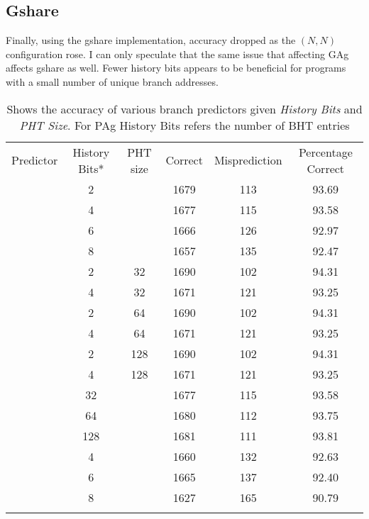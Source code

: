 \documentclass[letterpaper,11pt]{article}
\begin{document}
\subsection{Gshare}
Finally, using the gshare implementation, accuracy dropped as the $(N,N)$ configuration rose. I can only speculate that the same issue that affecting GAg affects gshare as well. Fewer history bits appears to be beneficial for programs with a small number of unique branch addresses.


\begin{table}[tbh]
\centering
\begin{tabular}{!{\vrule width 1pt}c|c|c|c|c|c!{\vrule width 1pt}}
Predictor & History Bits* & PHT size & Correct & Misprediction & Percentage Correct\\
 & 2 &  & 1679 & 113 & 93.69\\
 & 4 &  & 1677 & 115 & 93.58\\
 & 6 &  & 1666 & 126 & 92.97\\
 & 8 &  & 1657 & 135 & 92.47\\
 & 2 & 32 & 1690 & 102 & 94.31\\
 & 4 & 32 & 1671 & 121 & 93.25\\
 & 2 & 64 & 1690 & 102 & 94.31\\
 & 4 & 64 & 1671 & 121 & 93.25\\
 & 2 & 128 & 1690 & 102 & 94.31\\
 & 4 & 128 & 1671 & 121 & 93.25\\
 & 32 &  & 1677 & 115 & 93.58\\
 & 64 &  & 1680 & 112 & 93.75\\
 & 128 &  & 1681 & 111 & 93.81\\
 & 4 &  & 1660 & 132 & 92.63\\
 & 6 &  & 1665 & 137 & 92.40\\
 & 8 &  & 1627 & 165 & 90.79\\
\end{tabular}
\caption{Shows the accuracy of various branch predictors given {\em History Bits} and {\em PHT Size}. 
{\scriptsize *For PAg History Bits refers the number of BHT entries}}
\end{table}
\end{document}
